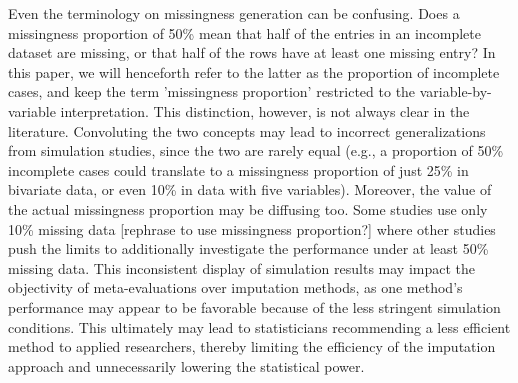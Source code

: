\documentclass[bimj,fleqn]{w-art}
\theoremstyle{plain}
\theoremstyle{definition}
\begin{document}

Even the terminology on missingness generation can be confusing. Does a missingness proportion of 50\% mean that half of the entries in an incomplete dataset are missing, or that half of the rows have at least one missing entry? In this paper, we will henceforth refer to the latter as the proportion of incomplete cases, and keep the term 'missingness proportion' restricted to the variable-by-variable interpretation. This distinction, however, is not always clear in the literature. Convoluting the two concepts may lead to incorrect generalizations from simulation studies, since the two are rarely equal (e.g., a proportion of 50\% incomplete cases could translate to a missingness proportion of just 25\% in bivariate data, or even 10\% in data with five variables). Moreover, the value of the actual missingness proportion may be diffusing too. Some studies use only 10\% missing data [rephrase to use missingness proportion?] where other studies push the limits to additionally investigate the performance under at least 50\% missing data. This inconsistent display of simulation results may impact the objectivity of meta-evaluations over imputation methods, as one method's performance may appear to be favorable because of the less stringent simulation conditions. This ultimately may lead to statisticians recommending a less efficient method to applied researchers, thereby limiting the efficiency of the imputation approach and unnecessarily lowering the statistical power.

\end{document}
